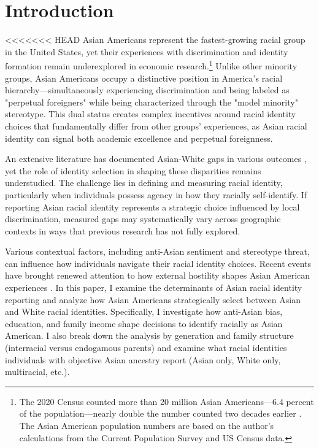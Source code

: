 
\section{Introduction}\label{sec:intro}

<<<<<<< HEAD
Asian Americans represent the fastest-growing racial group in the United States, yet their experiences with discrimination and identity formation remain underexplored in economic research.\footnote{The 2020 Census counted more than 20 million Asian Americans---6.4 percent of the population—nearly double the number counted two decades earlier \autocite{floodsarahIntegratedPublicUse2021a}. The Asian American population numbers are based on the author's calculations from the Current Population Survey and US Census data.} Unlike other minority groups, Asian Americans occupy a distinctive position in America's racial hierarchy—simultaneously experiencing discrimination and being labeled as "perpetual foreigners" while being characterized through the "model minority" stereotype. This dual status creates complex incentives around racial identity choices that fundamentally differ from other groups' experiences, as Asian racial identity can signal both academic excellence and perpetual foreignness.

An extensive literature has documented Asian-White gaps in various outcomes \autocite{chiswick1983analysis, duleep2012economic, hilger2016upward, arabsheibani2010asian}, yet the role of identity selection in shaping these disparities remains understudied. The challenge lies in defining and measuring racial identity, particularly when individuals possess agency in how they racially self-identify. If reporting Asian racial identity represents a strategic choice influenced by local discrimination, measured gaps may systematically vary across geographic contexts in ways that previous research has not fully explored.

Various contextual factors, including anti-Asian sentiment and stereotype threat, can influence how individuals navigate their racial identity choices. Recent events have brought renewed attention to how external hostility shapes Asian American experiences \autocite{gover2020anti}. In this paper, I examine the determinants of Asian racial identity reporting and analyze how Asian Americans strategically select between Asian and White racial identities. Specifically, I investigate how anti-Asian bias, education, and family income shape decisions to identify racially as Asian American. I also break down the analysis by generation and family structure (interracial versus endogamous parents) and examine what racial identities individuals with objective Asian ancestry report (Asian only, White only, multiracial, etc.).

